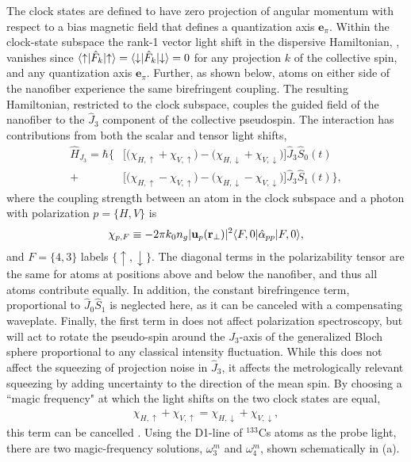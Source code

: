 \documentclass[preprint, aps,pra,onecolumn]{revtex4-1} %
\newcommand{\jz}{\hat{J}_3}
\newcommand{\magic}[1]{\omega_{#1}^m}
\begin{document}
The clock states are defined to have zero projection of angular momentum with respect to a bias magnetic field that defines a quantization axis $\mathbf{e}_\pi$.  
Within the clock-state subspace the rank-1 vector light shift in the dispersive Hamiltonian, , vanishes since $\langle{\uparrow}\rvert\hat{F}_k \lvert{\uparrow}\rangle =\langle{\downarrow}\rvert\hat{F}_k \lvert{\downarrow}\rangle = 0$ for any projection $k$ of the collective spin, and any quantization axis $\mathbf{e}_\pi$. 
Further, as shown below, atoms on either side of the nanofiber experience the same birefringent coupling. 
The resulting Hamiltonian, restricted to the clock subspace, couples the guided field of the nanofiber to the $\hat{J}_3$ component of the collective pseudospin. The interaction has contributions from both the scalar and tensor light shifts,
	\begin{align} \label{Eq::ClockHamiltonian}
		\hat{H}_{J_3} = \hbar \Big\{ & \big[ \big( \chi_{H,\uparrow} +\chi_{V,\uparrow} \big) - \big( \chi_{H,\downarrow} + \chi_{V,\downarrow}\big) \big] \jz \hat{S}_0(t) \\
		+ & \big[  \big( \chi_{H, \uparrow} - \chi_{V,\uparrow} \big) - \big(\chi_{H,\downarrow} - \chi_{V,\downarrow} \big) \big]  \jz \hat{S}_1(t) \Big\}, \nonumber
	\end{align}
where the coupling strength between an atom in the clock subspace and a photon with polarization $p = \{H,V\}$ is
	\begin{equation} \label{Eq::ClockCouplingStrength}
		\chi_{p,F} \equiv - 2\pi k_0 n_g  | \mathbf{u}_p(\mathbf{r}_\perp)|^2 \langle{F,0}\rvert\hat{\alpha}_{pp}  \lvert{F,0}\rangle,
	\end{equation}
and $F = \{4,3\}$ labels $\{\uparrow,\downarrow\}$.  
The diagonal terms in the polarizability tensor are the same for atoms at positions above and below the nanofiber, and thus all atoms contribute equally. 
In addition, the constant birefringence term, proportional to $ \hat{J}_0\hat{S}_1 $ is neglected here, as it can be canceled with a compensating waveplate. 
Finally, the first term in  does not affect polarization spectroscopy, but will act to rotate the pseudo-spin around the $J_3$-axis of the generalized Bloch sphere proportional to any classical intensity fluctuation.
While this does not affect the squeezing of projection noise in $\hat{J}_3$, it affects the metrologically relevant squeezing by adding uncertainty to the direction of the mean spin.  By choosing a ``magic frequency" at which the light shifts on the two clock states are equal, 
	\begin{align} \label{Eq::MagicWavelengthCondition}
		\chi_{H,\uparrow} +\chi_{V,\uparrow}  = \chi_{H,\downarrow} + \chi_{V,\downarrow},
	\end{align}
this term can be cancelled \cite{chaudhury_continuous_2006}.
Using the D1-line of $^{133}$Cs atoms as the probe light, there are two magic-frequency solutions, $ \magic{3} $ and $\magic{4}$, shown schematically in (a).  
\end{document}
